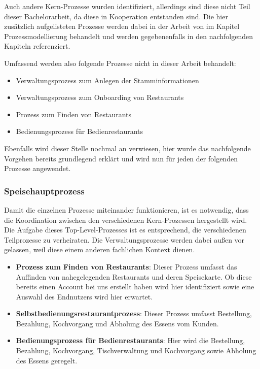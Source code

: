Auch andere Kern-Prozesse wurden identifiziert, allerdings sind diese nicht Teil dieser Bachelorarbeit, da diese in Kooperation entstanden sind. Die hier zusätzlich aufgelisteten Prozesse werden dabei in der Arbeit von \cite{ott_konzeption_2025} im Kapitel Prozessmodellierung behandelt und werden gegebenenfalls in den nachfolgenden Kapiteln referenziert. 

Umfassend werden also folgende Prozesse nicht in dieser Arbeit behandelt: 
\begin{itemize}
    \item Verwaltungsprozess zum Anlegen der Stamminformationen
    \item Verwaltungsprozess zum Onboarding von Restaurants
    \item Prozess zum Finden von Restaurants
    \item Bedienungsprozess für Bedienrestaurants
\end{itemize}

Ebenfalls wird dieser Stelle nochmal an  verwiesen, hier wurde das nachfolgende Vorgehen bereits grundlegend erklärt und wird nun für jeden der folgenden Prozesse angewendet.

\subsubsection{Speisehauptprozess}
Damit die einzelnen Prozesse miteinander funktionieren, ist es notwendig, dass die Koordination zwischen den verschiedenen Kern-Prozessen hergestellt wird. Die Aufgabe dieses Top-Level-Prozesses ist es entsprechend, die verschiedenen Teilprozesse zu verheiraten. Die Verwaltungsprozesse werden dabei außen vor gelassen, weil diese einem anderen fachlichen Kontext dienen. 

\begin{itemize}
    \item \textbf{Prozess zum Finden von Restaurants}: Dieser Prozess umfasst das Auffinden von nahegelegenden Restaurants und deren Speisekarte. Ob diese bereits einen Account bei uns erstellt haben wird hier identifiziert sowie eine Auswahl des Endnutzers wird hier erwartet.
    
    \item \textbf{Selbstbedienungsrestaurantprozess}: Dieser Prozess umfasst Bestellung, Bezahlung, Kochvorgang und Abholung des Essens vom Kunden.
    
    \item \textbf{Bedienungsprozess für Bedienrestaurants}: Hier wird die Bestellung, Bezahlung, Kochvorgang, Tischverwaltung und Kochvorgang sowie Abholung des Essens geregelt. 
\end{itemize}

